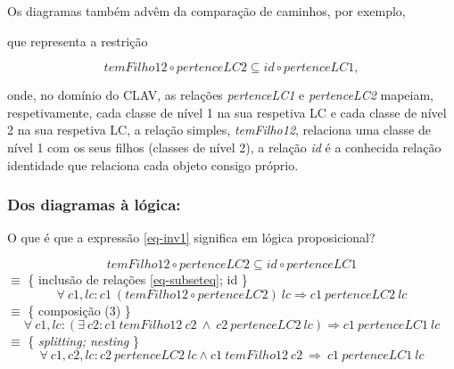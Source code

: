 \documentclass[tikz,runningheads,a4paper]{llncs}
\begin{document}
Os diagramas também advêm da comparação de caminhos, por exemplo,

\begin{center}
\end{center}

\noindent que representa a restrição

\begin{equation}
\label{eq-inv1}
    temFilho12 \circ pertenceLC2 \subseteq id \circ pertenceLC1,
\end{equation}

\noindent onde, no domínio do CLAV, as relações \textit{pertenceLC1} e \textit{pertenceLC2} mapeiam, respetivamente, cada classe de nível 1 na sua respetiva LC e cada classe de nível 2 na sua respetiva LC, a relação simples, \textit{temFilho12}, relaciona uma classe de nível 1 com os seus filhos (classes de nível 2), a relação \textit{id} é a conhecida relação identidade que relaciona cada objeto consigo próprio.

\subsubsection{Dos diagramas à lógica\cite{jno}\cite{jno-5}:}

O que é que a expressão \eqref{eq-inv1} significa em lógica proposicional?

\begin{equation*}
    temFilho12 \circ pertenceLC2 \subseteq id \circ pertenceLC1
\end{equation*}
$\equiv$ \{ inclusão de relações \eqref{eq-subseteq}; id \}
\begin{equation*}
    \forall\ c1, lc : c1\ (temFilho12 \circ pertenceLC2)\ lc \Rightarrow c1\ pertenceLC2\ lc
\end{equation*}
$\equiv$ \{ composição (3) \}
\begin{equation*}
    \forall\ c1, lc : (\exists\ c2 : c1\ temFilho12\ c2\ \land\ c2\ pertenceLC2\ lc) \Rightarrow c1\ pertenceLC1\ lc
\end{equation*}
$\equiv$ \{ \textit{splitting; nesting} \}
\begin{equation*}
    \forall\ c1, c2, lc : c2\ pertenceLC2\ lc \land c1\ temFilho12\ c2\ \Rightarrow \ c1\ pertenceLC1\ lc
\end{equation*}
\end{document}
